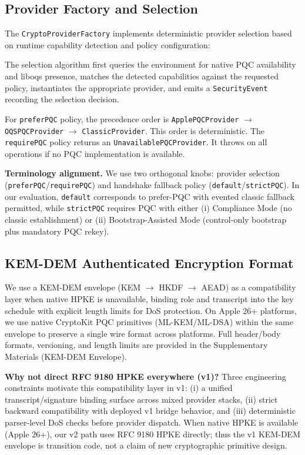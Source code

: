 \documentclass[10pt,journal,compsoc]{IEEEtran}
\begin{document}
\subsection{Provider Factory and
Selection}\label{d.-provider-factory-and-selection}

The \texttt{CryptoProviderFactory} implements deterministic provider
selection based on runtime capability detection and policy
configuration:


The selection algorithm first queries the environment for native PQC
availability and liboqs presence, matches the detected capabilities
against the requested policy, instantiates the appropriate provider, and
emits a \texttt{SecurityEvent} recording the selection decision.

{\raggedright
For \texttt{preferPQC} policy, the precedence order is
\texttt{ApplePQCProvider} $\rightarrow$ \texttt{OQSPQCProvider} $\rightarrow$
\texttt{ClassicProvider}. This order is deterministic. The
\texttt{requirePQC} policy returns an \texttt{UnavailablePQCProvider}. It
throws on all operations if no PQC implementation is available.\par}

\textbf{Terminology alignment.}
We use two orthogonal knobs: provider selection
(\texttt{preferPQC}/\texttt{requirePQC}) and handshake fallback policy
(\texttt{default}/\texttt{strictPQC}). In our evaluation, \texttt{default}
corresponds to prefer-PQC with evented classic fallback permitted, while
\texttt{strictPQC} requires PQC with either (i) Compliance Mode
(no classic establishment) or (ii) Bootstrap-Assisted Mode
(control-only bootstrap plus mandatory PQC rekey).

\subsection{KEM-DEM Authenticated Encryption
Format}\label{e.-kem-dem-authenticated-encryption-format}

We use a KEM-DEM envelope (KEM $\rightarrow$ HKDF $\rightarrow$ AEAD) as
a compatibility layer when native HPKE is unavailable, binding role and
transcript into the key schedule with explicit length limits for DoS
protection. On Apple 26+ platforms, we use native CryptoKit PQC
primitives (ML-KEM/ML-DSA) within the same envelope to preserve a single
wire format across platforms. Full header/body formats, versioning, and
length limits are provided in the Supplementary Materials (KEM-DEM
Envelope).

\textbf{Why not direct RFC 9180 HPKE everywhere (v1)?}
Three engineering constraints motivate this compatibility layer in v1:
(i) a unified transcript/signature binding surface across mixed
provider stacks, (ii) strict backward compatibility with deployed v1
bridge behavior, and (iii) deterministic parser-level DoS checks before
provider dispatch. When native HPKE is available (Apple 26+), our v2
path uses RFC 9180 HPKE directly; thus the v1 KEM-DEM envelope is
transition code, not a claim of new cryptographic primitive design.
\end{document}
